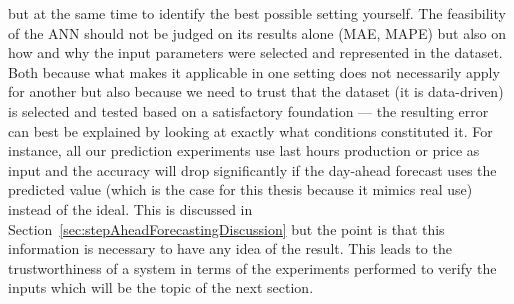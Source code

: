 but at the same time to identify the best possible setting yourself. The feasibility of the ANN should not be judged on its results alone (MAE, MAPE) but also on how and why the input parameters were selected and represented in the dataset. Both because what makes it applicable in one setting does not necessarily apply for another but also because we need to trust that the dataset (it is data-driven) is selected and tested based on a satisfactory foundation --- the resulting error can best be explained by looking at exactly what conditions constituted it. For instance, all our prediction experiments use last hours production or price as input and the accuracy will drop significantly if the day-ahead forecast uses the predicted value (which is the case for this thesis because it mimics real use) instead of the ideal. This is discussed in Section~\ref{sec:stepAheadForecastingDiscussion} but the point is that this information is necessary to have any idea of the result. This leads to the trustworthiness of a system in terms of the experiments performed to verify the inputs which will be the topic of the next section.  


